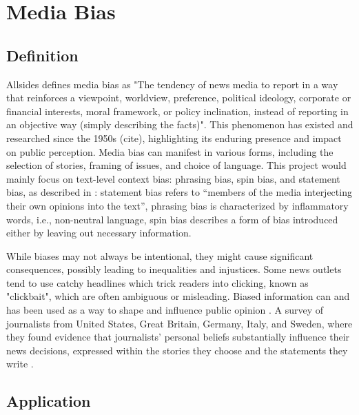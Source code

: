\chapter{Media Bias}
\label{cha:2}

\section{Definition} \label{media-bias-definition}

Allsides \cite{allsides-2022-bias-definition} defines media bias as "The tendency of news media to report in a way that reinforces a viewpoint, worldview, preference, political ideology, corporate or financial interests, moral framework, or policy inclination, instead of reporting in an objective way (simply describing the facts)". This phenomenon has existed and researched since the 1950s (cite), highlighting its enduring presence and impact on public perception. Media bias can manifest in various forms, including the selection of stories, framing of issues, and choice of language. This project would mainly focus on text-level context bias: phrasing bias, spin bias, and statement bias, as described in \cite{spinde-2024-taxonomy}: statement bias refers to “members of the media interjecting their own opinions into the text”, phrasing bias is characterized by inflammatory words, i.e., non-neutral language, spin bias describes a form of bias introduced either by leaving out necessary information.

While biases may not always be intentional, they might cause significant consequences, possibly leading to inequalities and injustices. Some news outlets tend to use catchy headlines which trick readers into clicking, known as "clickbait", which are often ambiguous or misleading. Biased information can and has been used as a way to shape and influence public opinion \cite{aires-2020-information}. A survey of journalists from United States, Great Britain, Germany, Italy, and Sweden, where they found evidence that journalists' personal beliefs substantially influence their news decisions, expressed within the stories they choose and the statements they write \cite{patterson-donsbach-1996-news-decisions}.

\section{Application}

